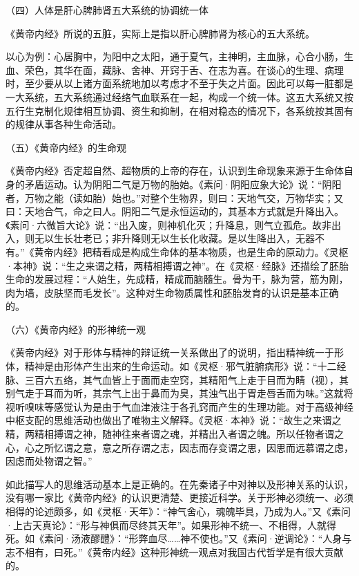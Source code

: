 \documentclass[a4paper,12pt,UTF8,twoside]{ctexbook}
\begin{document}
	（四）人体是肝心脾肺肾五大系统的协调统一体
	
	《黄帝内经》所说的五脏，实际上是指以肝心脾肺肾为核心的五大系统。
	
	以心为例：心居胸中，为阳中之太阳，通于夏气，主神明，主血脉，心合小肠，生血、荣色，其华在面，藏脉、舍神、开窍于舌、在志为喜。在谈心的生理、病理时，至少要从以上诸方面系统地加以考虑才不至于失之片面。因此可以每一脏都是一大系统，五大系统通过经络气血联系在一起，构成一个统一体。这五大系统又按五行生克制化规律相互协调、资生和抑制，在相对稳态的情况下，各系统按其固有的规律从事各种生命活动。
	
	（五）《黄帝内经》的生命观
	
	《黄帝内经》否定超自然、超物质的上帝的存在，认识到生命现象来源于生命体自身的矛盾运动。认为阴阳二气是万物的胎始。《素问·阴阳应象大论》说：“阴阳者，万物之能（读如胎）始也。”对整个生物界，则曰：天地气交，万物华实；又曰：天地合气，命之曰人。阴阳二气是永恒运动的，其基本方式就是升降出入。《素问·六微旨大论》说：“出入废，则神机化灭；升降息，则气立孤危。故非出入，则无以生长壮老已；非升降则无以生长化收藏。是以生降出入，无器不有。”《黄帝内经》把精看成是构成生命体的基本物质，也是生命的原动力。《灵枢·本神》说：“生之来谓之精，两精相搏谓之神”。在《灵枢·经脉》还描绘了胚胎生命的发展过程：“人始生，先成精，精成而脑髓生。骨为干，脉为营，筋为刚，肉为墙，皮肤坚而毛发长”。这种对生命物质属性和胚胎发育的认识是基本正确的。
	
	（六）《黄帝内经》的形神统一观
	
	《黄帝内经》对于形体与精神的辩证统一关系做出了的说明，指出精神统一于形体，精神是由形体产生出来的生命运动。如《灵枢·邪气脏腑病形》说：“十二经脉、三百六五络，其气血皆上于面而走空窍，其精阳气上走于目而为睛（视），其别气走于耳而为听，其宗气上出于鼻而为臭，其浊气出于胃走唇舌而为味。”这就将视听嗅味等感觉认为是由于气血津液注于各孔窍而产生的生理功能。对于高级神经中枢支配的思维活动也做出了唯物主义解释。《灵枢·本神》说：“故生之来谓之精，两精相搏谓之神，随神往来者谓之魂，并精出入者谓之魄。所以任物者谓之心，心之所忆谓之意，意之所存谓之志，因志而存变谓之思，因思而远慕谓之虑，因虑而处物谓之智。”
	
	如此描写人的思维活动基本上是正确的。在先秦诸子中对神以及形神关系的认识，没有哪一家比《黄帝内经》的认识更清楚、更接近科学。关于形神必须统一、必须相得的论述颇多，如《灵枢·天年》：“神气舍心，魂魄毕具，乃成为人。”又《素问·上古天真论》：“形与神俱而尽终其天年”。如果形神不统一、不相得，人就得死。如《素问·汤液醪醴》：“形弊血尽……神不使也。”又《素问·逆调论》：“人身与志不相有，曰死。”《黄帝内经》这种形神统一观点对我国古代哲学是有很大贡献的。
	
\end{document}
